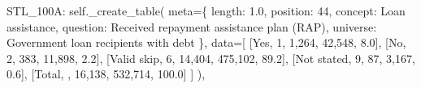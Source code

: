 \documentclass[
  11pt,
  a4paper,
]{article}
\newenvironment{Shaded}{\begin{snugshade}}{\end{snugshade}}
\newcommand{\NormalTok}[1]{\textcolor[rgb]{0.00,0.23,0.31}{#1}}
\newcommand{\OperatorTok}[1]{\textcolor[rgb]{0.37,0.37,0.37}{#1}}
\newcommand{\StringTok}[1]{\textcolor[rgb]{0.13,0.47,0.30}{#1}}
\newcommand{\VariableTok}[1]{\textcolor[rgb]{0.07,0.07,0.07}{#1}}
\begin{document}
\begin{Shaded}
\begin{Highlighting}[]
            \StringTok{\textquotesingle{}STL\_100A\textquotesingle{}}\NormalTok{: }\VariableTok{self}\NormalTok{.\_create\_table(}
\NormalTok{                meta}\OperatorTok{=}\NormalTok{\{}
                \StringTok{\textquotesingle{}length\textquotesingle{}}\NormalTok{: }\StringTok{\textquotesingle{}1.0\textquotesingle{}}\NormalTok{, }\StringTok{\textquotesingle{}position\textquotesingle{}}\NormalTok{: }\StringTok{\textquotesingle{}44\textquotesingle{}}\NormalTok{,}
                \StringTok{\textquotesingle{}concept\textquotesingle{}}\NormalTok{: }\StringTok{\textquotesingle{}Loan assistance\textquotesingle{}}\NormalTok{,}
                \StringTok{\textquotesingle{}question\textquotesingle{}}\NormalTok{: }\StringTok{\textquotesingle{}Received repayment assistance plan (RAP)\textquotesingle{}}\NormalTok{,}
                \StringTok{\textquotesingle{}universe\textquotesingle{}}\NormalTok{: }\StringTok{\textquotesingle{}Government loan recipients with debt\textquotesingle{}}
\NormalTok{                \},}
\NormalTok{                data}\OperatorTok{=}\NormalTok{[}
\NormalTok{                [}\StringTok{\textquotesingle{}Yes\textquotesingle{}}\NormalTok{, }\StringTok{\textquotesingle{}1\textquotesingle{}}\NormalTok{, }\StringTok{\textquotesingle{}1,264\textquotesingle{}}\NormalTok{, }\StringTok{\textquotesingle{}42,548\textquotesingle{}}\NormalTok{, }\StringTok{\textquotesingle{}8.0\textquotesingle{}}\NormalTok{],}
\NormalTok{                [}\StringTok{\textquotesingle{}No\textquotesingle{}}\NormalTok{, }\StringTok{\textquotesingle{}2\textquotesingle{}}\NormalTok{, }\StringTok{\textquotesingle{}383\textquotesingle{}}\NormalTok{, }\StringTok{\textquotesingle{}11,898\textquotesingle{}}\NormalTok{, }\StringTok{\textquotesingle{}2.2\textquotesingle{}}\NormalTok{],}
\NormalTok{                [}\StringTok{\textquotesingle{}Valid skip\textquotesingle{}}\NormalTok{, }\StringTok{\textquotesingle{}6\textquotesingle{}}\NormalTok{, }\StringTok{\textquotesingle{}14,404\textquotesingle{}}\NormalTok{, }\StringTok{\textquotesingle{}475,102\textquotesingle{}}\NormalTok{, }\StringTok{\textquotesingle{}89.2\textquotesingle{}}\NormalTok{],}
\NormalTok{                [}\StringTok{\textquotesingle{}Not stated\textquotesingle{}}\NormalTok{, }\StringTok{\textquotesingle{}9\textquotesingle{}}\NormalTok{, }\StringTok{\textquotesingle{}87\textquotesingle{}}\NormalTok{, }\StringTok{\textquotesingle{}3,167\textquotesingle{}}\NormalTok{, }\StringTok{\textquotesingle{}0.6\textquotesingle{}}\NormalTok{],}
\NormalTok{                [}\StringTok{\textquotesingle{}Total\textquotesingle{}}\NormalTok{, }\StringTok{\textquotesingle{}\textquotesingle{}}\NormalTok{, }\StringTok{\textquotesingle{}16,138\textquotesingle{}}\NormalTok{, }\StringTok{\textquotesingle{}532,714\textquotesingle{}}\NormalTok{, }\StringTok{\textquotesingle{}100.0\textquotesingle{}}\NormalTok{]}
\NormalTok{                ]}
\NormalTok{            ),}
        

\end{Highlighting}
\end{Shaded}
\end{document}
